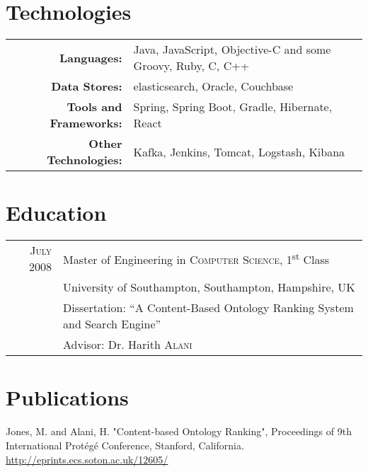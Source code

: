 \documentclass[a4paper,10pt]{article}
\begin{document}
\section{Technologies}
\begin{tabular}{rl}
\textbf{Languages:}& Java, JavaScript, Objective-C and some Groovy, Ruby, C, C++
\setmainfont[SmallCapsFont=Fontin-SmallCaps.otf]{Fontin.otf}\\
\textbf{Data Stores:}& elasticsearch, Oracle, Couchbase\\
\textbf{Tools and Frameworks:}& Spring, Spring Boot, Gradle, Hibernate, React\\
\textbf{Other Technologies:}& Kafka, Jenkins, Tomcat, Logstash, Kibana\\
\end{tabular}

\section{Education}
\begin{tabular}{rl}	
 \textsc{July} 2008 & Master of Engineering in \textsc{Computer Science}, 1\textsuperscript{st} Class\\
& University of Southampton, Southampton, Hampshire, UK\\
&\small Dissertation: ``A Content-Based Ontology Ranking System and Search Engine'' \\
&\small Advisor: Dr. Harith \textsc{Alani}\\
\end{tabular}

\section{Publications}
{Jones, M. and Alani, H. "Content-based Ontology Ranking", Proceedings of 9th International Prot\'{e}g\'{e} Conference, Stanford, California.\\}
\url{http://eprints.ecs.soton.ac.uk/12605/}

\end{document}
